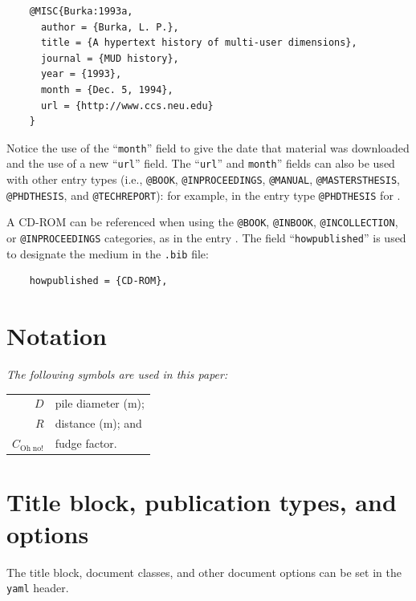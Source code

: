 \documentclass[Journal,LineNumbers]{ascelike-new}
\begin{document}
\begin{verbatim}
    @MISC{Burka:1993a,
      author = {Burka, L. P.},
      title = {A hypertext history of multi-user dimensions},
      journal = {MUD history},
      year = {1993},
      month = {Dec. 5, 1994},
      url = {http://www.ccs.neu.edu}
    }
\end{verbatim}

Notice the use of the ``\texttt{month}'' field to give the date that
material was downloaded and the use of a new ``\texttt{url}'' field. The
``\texttt{url}'' and \texttt{month}'' fields can also be used with other
entry types (i.e., \texttt{@BOOK}, \texttt{@INPROCEEDINGS},
\texttt{@MANUAL}, \texttt{@MASTERSTHESIS}, \texttt{@PHDTHESIS}, and
\texttt{@TECHREPORT}): for example, in the entry type
\texttt{@PHDTHESIS} for \citep{Wichtmann:2005a}.

A CD-ROM can be referenced when using the \texttt{@BOOK},
\texttt{@INBOOK}, \texttt{@INCOLLECTION}, or \texttt{@INPROCEEDINGS}
categories, as in the entry \citep{Liggett:1998a}. The field
``\texttt{howpublished}'' is used to designate the medium in the
\texttt{.bib} file:

\begin{verbatim}
    howpublished = {CD-ROM},
\end{verbatim}

\appendix

\section{Notation}\label{sec-app-notation}

\emph{The following symbols are used in this paper:}

\begin{tabular}{r  @{\hspace{1em}=\hspace{1em}}  l}
$D$                    & pile diameter (m); \\
$R$                    & distance (m);      and\\
$C_{\mathrm{Oh\;no!}}$ & fudge factor.
\end{tabular}

\section{Title block, publication types, and
options}\label{sec-app-options}

The title block, document classes, and other document options can be set
in the \texttt{yaml} header.
\end{document}
